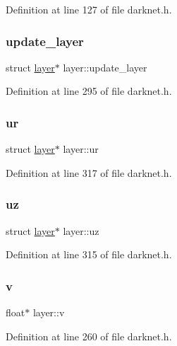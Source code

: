 Definition at line 127 of file darknet.\+h.

\mbox{\label{structlayer_a777da8634fb7e1e1243c79dbec93304e}} 
\subsubsection{\texorpdfstring{update\_layer}{update\_layer}}
{\footnotesize\ttfamily struct \mbox{\hyperlink{structlayer}{layer}}$\ast$ layer\+::update\+\_\+layer}



Definition at line 295 of file darknet.\+h.

\mbox{\label{structlayer_a9e91b6abfb4f0d901e6e62c46f8ccab9}} 
\subsubsection{\texorpdfstring{ur}{ur}}
{\footnotesize\ttfamily struct \mbox{\hyperlink{structlayer}{layer}}$\ast$ layer\+::ur}



Definition at line 317 of file darknet.\+h.

\mbox{\label{structlayer_aebc50a1f698ed78ce6ca500609ad7308}} 
\subsubsection{\texorpdfstring{uz}{uz}}
{\footnotesize\ttfamily struct \mbox{\hyperlink{structlayer}{layer}}$\ast$ layer\+::uz}



Definition at line 315 of file darknet.\+h.

\mbox{\label{structlayer_a9493ddf18d4f6d9234a703d2575697db}} 
\subsubsection{\texorpdfstring{v}{v}}
{\footnotesize\ttfamily float$\ast$ layer\+::v}



Definition at line 260 of file darknet.\+h.

